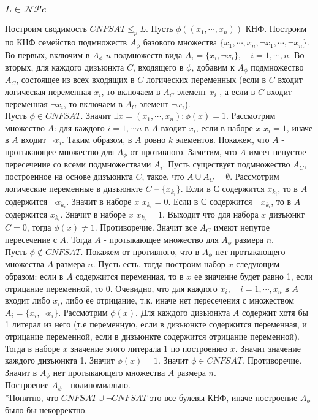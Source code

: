 \documentclass{article}
\begin{document}
\subsubsection*{$L \in \mathcal{NP}c$}
Построим сводимость $CNFSAT \leq_p L$.
Пусть $\phi((x_1, \cdots , x_n))$ КНФ. Построим по КНФ семейство подмножеств $A_{\phi}$ базового множества $\{x_1, \cdots, x_n, \neg x_1, \cdots , \neg x_n\}$. Во-первых, включим в $A_{\phi}$ $n$ подмножеств вида $A_i = \{x_i, \neg x_i\}, \quad i = 1, \cdots, n$. Во-вторых, для каждого дизъюнкта $C$, входящего в $\phi$, добавим к $A_{\phi}$ подмножество $A_C$, состоящее из всех входящих в $C$ логических переменных (если в $C$ входит логическая переменная $x_i$, то включаем в $A_C$ элемент $x_i$ , а если в $C$ входит переменная $\neg x_i$, то включаем в $A_C$ элемент $\neg x_i$).\\
Пусть $\phi \in CNFSAT$. Значит $\exists x = (x_1, \cdots, x_n) : \phi(x) = 1$. Рассмотрим множество $A$: для каждого  $ i = 1, \cdots n$ в $A$ входит $x_i$, если в наборе $x$ $x_i = 1$, иначе в $A$ входит $\neg x_i$. Таким образом, в $A$ ровно $k$ элементов. Покажем, что $A$ - протыкающее множество для $A_{\phi}$ от противного. Заметим, что $A$ имеет непустое пересечение со всеми подмножествами $A_i$. Пусть существует подмножество $A_C$, построенное на основе дизъюнкта $C$, такое, что $A \cup A_C = \emptyset$. Рассмотрим логические переменные в дизъюнкте $C$ -- $\{x_{k_i}\}$. Если в С содержится $x_{k_i}$, то в $A$ содержится $\neg x_{k_i}$. Значит в наборе $x$ $x_{k_i} = 0$. Если в С содержится $\neg x_{k_i}$, то в $A$ содержится $ x_{k_i}$. Значит в наборе $x$ $x_{k_i} = 1$. Выходит что для набора $x$ дизъюнкт $C = 0$, тогда $\phi(x) \neq 1$. Противоречие. Значит все $A_C$ имеют непутое пересечение с $A$. Тогда $A$ - протыкающее множество для $A_{\phi}$ размера $n$.\\
Пусть $\phi \notin CNFSAT$. Покажем от противного, что в $A_{\phi}$ нет протыкающего множества $A$ размера $n$. Пусть есть, тогда построим набор $x$ следующим образом: если в $A$ содержится переменная, то в $x$ ее значение будет равно 1, если отрицание переменной, то 0. Очевидно, что для каждого $x_i, \quad i = 1, \cdots, x_n$ в $A$ входит либо $x_i$, либо ее отрицание, т.к. иначе нет пересечения с множеством $A_i = \{x_i, \neg x_i\}$. Рассмотрим $\phi(x)$. Для каждого дизъюнкта $A$ содержит хотя бы 1 литерал из него (т.е переменную, если в дизъюнкте содержится переменная, и отрицание переменной, если в дизъюнкте содержится отрицание переменной). Тогда в наборе $x$ значение этого литерала 1 по построению $x$. Значит значение каждого дизъюнкта 1. Значит $\phi(x) = 1$. Значит $\phi \in CNFSAT$. Противоречие. Значит в $A_{\phi}$ нет протыкающего множества $A$ размера $n$.\\
Построение $A_{\phi}$ - полиномиально.\\
*Понятно, что $CNFSAT \cup \neg CNFSAT$ это все булевы КНФ, иначе построение $A_{\phi}$ было бы некорректно.
\end{document}
